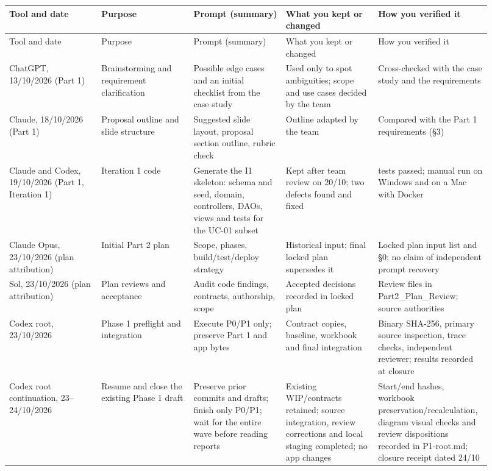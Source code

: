 \begin{longtable}{>{\raggedright\arraybackslash}p{0.1840\linewidth}>{\raggedright\arraybackslash}p{0.1840\linewidth}>{\raggedright\arraybackslash}p{0.1840\linewidth}>{\raggedright\arraybackslash}p{0.1840\linewidth}>{\raggedright\arraybackslash}p{0.1840\linewidth}}
Tool and date & Purpose & Prompt (summary) & What you kept or changed & How you verified it \\
\hline\endfirsthead
Tool and date & Purpose & Prompt (summary) & What you kept or changed & How you verified it \\
\hline\endhead
ChatGPT, 13/10/2026 (Part 1) & Brainstorming and requirement clarification & Possible edge cases and an initial checklist from the case study & Used only to spot ambiguities; scope and use cases decided by the team & Cross-checked with the case study and the requirements \\
Claude, 18/10/2026 (Part 1) & Proposal outline and slide structure & Suggested slide layout, proposal section outline, rubric check & Outline adapted by the team & Compared with the Part 1 requirements (\S{}3) \\
Claude and Codex, 19/10/2026 (Part 1, Iteration 1) & Iteration 1 code & Generate the I1 skeleton: schema and seed, domain, controllers, DAOs, views and tests for the UC-01 subset & Kept after team review on 20/10; two defects found and fixed & 93 tests passed; manual run on Windows and on a Mac with Docker \\
Claude Opus, 23/10/2026 (plan attribution) & Initial Part 2 plan & Scope, phases, build/test/deploy strategy & Historical input; final locked plan supersedes it & Locked plan input list and \S{}0; no claim of independent prompt recovery \\
Sol, 23/10/2026 (plan attribution) & Plan reviews and acceptance & Audit code findings, contracts, authorship, scope & Accepted decisions recorded in locked plan & Review files in Part2\_Plan\_Review; source authorities \\
Codex root, 23/10/2026 & Phase 1 preflight and integration & Execute P0/P1 only; preserve Part 1 and app bytes & Contract copies, baseline, workbook and final integration & Binary SHA-256, primary source inspection, trace checks, independent reviewer; results recorded at closure \\
Codex root continuation, 23--24/10/2026 & Resume and close the existing Phase 1 draft & Preserve prior commits and drafts; finish only P0/P1; wait for the entire wave before reading reports & Existing WIP/contracts retained; source integration, review corrections and local staging completed; no app changes & Start/end hashes, workbook preservation/recalculation, diagram visual checks and review dispositions recorded in P1-root.md; closure receipt dated 24/10 \\

\end{longtable}
